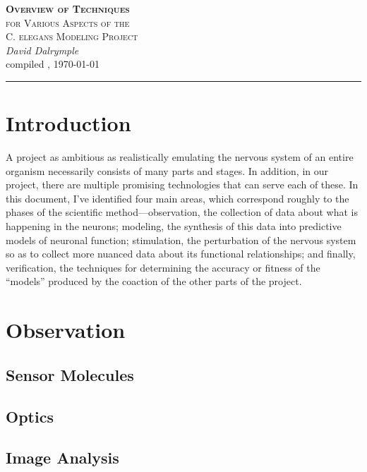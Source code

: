 \documentclass[letter,11pt]{article}
\begin{document}
\begin{center}
  \textsc{\LARGE \textbf{Overview of Techniques} \\[0.5mm] for Various Aspects of the \\[2.8mm] C. elegans Modeling Project}\\[3mm]
	\textit{\Large David Dalrymple}\\[2mm]
	{\large compiled \currenttime, \today\\[0mm]}
	\rule[2mm]{0.66\textwidth}{0.25mm}
\end{center}

\section*{Introduction}

A project as ambitious as realistically emulating the nervous system of an entire organism
necessarily consists of many parts and stages. In addition, in our project, there are
multiple promising technologies that can serve each of these. In this document, I've
identified four main areas, which correspond roughly to the phases of the scientific
method---observation, the collection of data about what is happening in the neurons;
modeling, the synthesis of this data into predictive models of neuronal function;
stimulation, the perturbation of the nervous system so as to collect more nuanced
data about its functional relationships; and finally, verification, the techniques
for determining the accuracy or fitness of the ``models'' produced by the coaction
of the other parts of the project.

\tableofcontents

\section{Observation}

\subsection{Sensor Molecules}

\subsection{Optics}



\subsection{Image Analysis}
\end{document}
